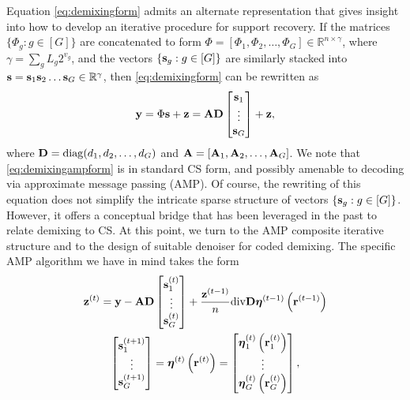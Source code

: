\documentclass[journal]{IEEEtran}
\begin{document}
Equation \eqref{eq:demixingform} admits an alternate representation that gives insight into how to develop an iterative procedure for support recovery.
If the matrices $\{\Phi_g : g \in [G]\}$ are concatenated to form $\Phi = [\Phi_1, \Phi_2, \ldots, \Phi_G] \in \mathbb{R}^{n \times \gamma}$, where $\gamma = \sum_g L_g 2^{v_g}$, and the vectors $\{\mathbf{s}_g : g\in [G]\}$ are similarly stacked into $\mathbf{s} = \mathbf{s}_1 \mathbf{s}_2 \ldots \mathbf{s}_G \in \mathbb{R}^{\gamma}$, then \eqref{eq:demixingform} can be rewritten as
\begin{equation}
    \label{eq:demixingampform}
    \mathbf{y} = \Phi\mathbf{s} + \mathbf{z} = \mathbf{A} \mathbf{D} \begin{bmatrix}\mathbf{s}_1 \\ \vdots \\ \mathbf{s}_G\\ \end{bmatrix} + \mathbf{z},
\end{equation}
where $\mathbf{D} = \operatorname{diag}(d_1, d_2, \ldots, d_G)$ and $\mathbf{A} = [\mathbf{A}_1, \mathbf{A}_2, \ldots, \mathbf{A}_G]$.
We note that \eqref{eq:demixingampform} is in standard CS form, and possibly amenable to decoding via approximate message passing (AMP).
Of course, the rewriting of this equation does not simplify the intricate sparse structure of vectors $\{ \mathbf{s}_g : g \in [G] \}$.
However, it offers a conceptual bridge that has been leveraged in the past to relate demixing to CS.
At this point, we turn to the AMP composite iterative structure and to the design of suitable denoiser for coded demixing.
The specific AMP algorithm we have in mind takes the form
\begin{gather}
    \label{eq:ampresidual}
    \mathbf{z}^{(t)} = \mathbf{y} - \mathbf{A} \mathbf{D} \begin{bmatrix}\mathbf{s}_1^{(t)} \\ \vdots \\ \mathbf{s}_G^{(t)}\\ \end{bmatrix}
    + \frac{\mathbf{z}^{(t - 1)}}{n}\mathrm{div}\mathbf{D}\boldsymbol{\eta}^{(t-1)}\left(\mathbf{r}^{(t-1)}\right) \\
    \label{eq:ampstateupdate}
    \begin{bmatrix} \mathbf{s}_1^{(t+1)} \\ \vdots \\ \mathbf{s}_G^{(t+1)}\\ \end{bmatrix}
    = \boldsymbol{\eta}^{(t)}\left(\mathbf{r}^{(t)}\right) = \begin{bmatrix} \boldsymbol{\eta}_1^{(t)}\left(\mathbf{r}_1^{(t)}\right) \\
    \vdots \\ \boldsymbol{\eta}_G^{(t)}\left(\mathbf{r}_G^{(t)}\right) \\
    \end{bmatrix},
\end{gather}
\end{document}
